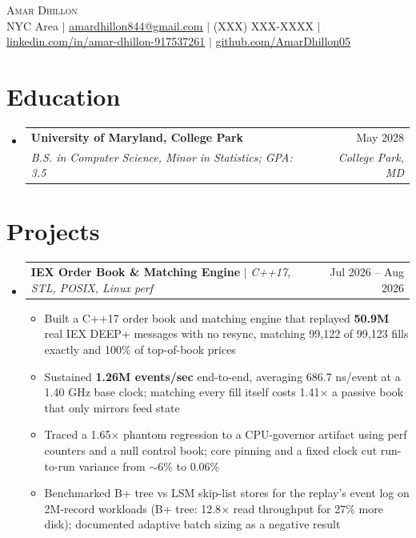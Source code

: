 \documentclass[letterpaper,10pt]{article}
\makeatletter
\newcommand{\resumeItem}[1]{\item{#1}\vspace{-1pt}}
\newcommand{\resumeSubheading}[4]{%
  \vspace{-1pt}\item
  \begin{tabular*}{\textwidth}[t]{l@{\extracolsep{\fill}}r}
    \textbf{#1} & #2 \\
    \textit{#3} & \textit{#4} \\
  \end{tabular*}\vspace{-6pt}%
}
\newcommand{\resumeProjectHeading}[2]{%
  \item
  \begin{tabular*}{\textwidth}{l@{\extracolsep{\fill}}r}
    #1 & #2 \\
  \end{tabular*}\vspace{-6pt}%
}
\newcommand{\resumeSubHeadingListStart}{\begin{itemize}[leftmargin=0in, label={}, itemsep=0pt, topsep=2pt]}
\newcommand{\resumeSubHeadingListEnd}{\end{itemize}}
\newcommand{\resumeItemListStart}{\begin{itemize}[leftmargin=0.18in, itemsep=0pt, topsep=1pt, parsep=0pt]}
\newcommand{\resumeItemListEnd}{\end{itemize}\vspace{0pt}}
\makeatother
\begin{document}
\begin{center}
  {\Huge\scshape\textcolor{accent}{Amar Dhillon}} \\ \vspace{3pt}
  \footnotesize
  NYC Area $|$
  \href{mailto:amardhillon844@gmail.com}{\underline{amardhillon844@gmail.com}} $|$
  (XXX) XXX-XXXX $|$
  \href{https://linkedin.com/in/amar-dhillon-917537261}{\underline{linkedin.com/in/amar-dhillon-917537261}} $|$
  \href{https://github.com/AmarDhillon05}{\underline{github.com/AmarDhillon05}}
\end{center}
\vspace{-6pt}

\section{Education}
\resumeSubHeadingListStart
  \resumeSubheading
    {University of Maryland, College Park}{May 2028}
    {B.S. in Computer Science, Minor in Statistics; GPA: 3.5}{College Park, MD}
\resumeSubHeadingListEnd

\section{Projects}
\resumeSubHeadingListStart
  \resumeProjectHeading
    {\textbf{IEX Order Book \& Matching Engine} $|$ \textit{C++17, STL, POSIX, Linux perf}}{Jul 2026 -- Aug 2026}
  \resumeItemListStart
    \resumeItem{Built a C++17 order book and matching engine that replayed \textbf{50.9M} real IEX DEEP+ messages with no resync, matching 99,122 of 99,123 fills exactly and 100\% of top-of-book prices}
    \resumeItem{Sustained \textbf{1.26M events/sec} end-to-end, averaging 686.7 ns/event at a 1.40 GHz base clock; matching every fill itself costs 1.41$\times$ a passive book that only mirrors feed state}
    \resumeItem{Traced a 1.65$\times$ phantom regression to a CPU-governor artifact using perf counters and a null control book; core pinning and a fixed clock cut run-to-run variance from $\sim$6\% to 0.06\%}
    \resumeItem{Benchmarked B+ tree vs LSM skip-list stores for the replay's event log on 2M-record workloads (B+ tree: 12.8$\times$ read throughput for 27\% more disk); documented adaptive batch sizing as a negative result}
  \resumeItemListEnd
\resumeSubHeadingListEnd
\end{document}
